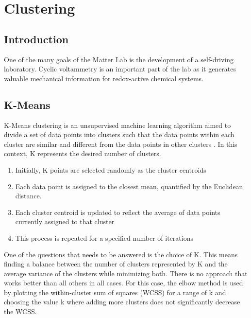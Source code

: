 \chapter{Clustering} \label{chap:chap-2}







\section{Introduction}
One of the many goals of the Matter Lab is the development of a self-driving laboratory. Cyclic voltammetry is an important part of the lab as it generates valuable mechanical information for redox-active chemical systems. 
\section{K-Means}
K-Means clustering is an unsupervised machine learning algorithm aimed to divide a set of data points into clusters such that the data points within each cluster are similar and different from the data points in other clusters \cite{MacQueen1967}. In this context, K represents the desired number of clusters. 
\begin{enumerate}
    \item Initially, K points are selected randomly as the cluster centroids
    \item Each data point is assigned to the closest mean, quantified by the Euclidean distance. 
    \item Each cluster centroid is updated to reflect the average of data points currently assigned to that cluster 
    \item This process is repeated for a specified number of iterations
\end{enumerate}

One of the questions that needs to be answered is the choice of K. This means finding a balance between the number of clusters represented by K and the average variance of the clusters while minimizing both. There is no approach that works better than all others in all cases. For this case, the elbow method is used by plotting the within-cluster sum of squares (WCSS) for a range of k and choosing the value k where adding more clusters does not significantly decrease the WCSS. 
